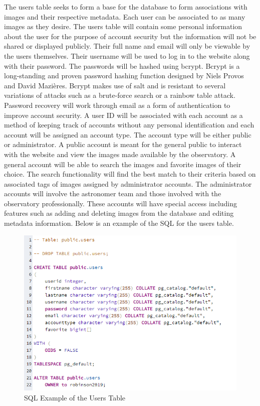 \documentclass[12pt]{report}
\begin{document}
The users table seeks to form a base for the database to form associations with images and their respective metadata.  Each user can be associated to as many images as they desire.  The users table will contain some personal information about the user for the purpose of account security but the information will not be shared or displayed publicly.  Their full name and email will only be viewable by the users themselves.  Their username will be used to log in to the website along with their password.  The passwords will be hashed using bcrypt.  Bcrypt is a long-standing and proven password hashing function designed by Niels Provos and David Mazières.  Bcrypt makes use of salt and is resistant to several variations of attacks such as a brute-force search or a rainbow table attack.  Password recovery will work through email as a form of authentication to improve account security.
A user ID will be associated with each account as a method of keeping track of accounts without any personal identification and each account will be assigned an account type.  The account type will be either public or administrator.  A public account is meant for the general public to interact with the website and view the images made available by the observatory.  A general account will be able to search the images and favorite images of their choice.  The search functionality will find the best match to their criteria based on associated tags of images assigned by administrator accounts.  The administrator accounts will involve the astronomer team and those involved with the observatory professionally.  These accounts will have special access including features such as adding and deleting images from the database and editing metadata information.
Below is an example of the SQL for the users table.


\begin{figure}[h]
	\centering
	\includegraphics[width=\linewidth]{database_user_table}
	\caption{SQL Example of the Users Table}
	\label{fig:SQL Users Table}
\end{figure}
\end{document}
